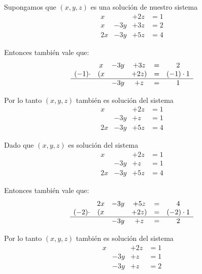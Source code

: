 \documentclass[handout]{beamer} %
\renewcommand{\_}[1]{_{\left( #1 \right)}}
\renewcommand{\^}[1]{^{\left( #1 \right)}}
\begin{document}
\begin{frame}
Supongamos que $(x,y,z)$ es una solución de nuestro sistema
\begin{equation*}
\begin{matrix}
x &  & +2z & = 1 \\
x& -3y & +3z & =2 \\
2x& -3y & +5z & =4
\end{matrix}
\end{equation*}

 
Entonces también vale que: 
\begin{equation*}
\begin{matrix}
&x& -3y & +3z & = & 2 \\
(-1)\cdot&(x &  & +2z) & = &(-1)\cdot1 \\
\hline
&& -3y & +z & = & 1  
\end{matrix}
\end{equation*}
\pause
 
Por lo tanto $(x,y,z)$ también es solución del sistema
\begin{equation*}
\begin{matrix}
x &  & +2z & = 1 \\
& -3y & +z & = 1   \\
2x& -3y & +5z & =4
\end{matrix}
\end{equation*}
 
\end{frame}


\begin{frame}

Dado que $(x,y,z)$ es solución del sistema
\begin{equation*}
\begin{matrix}
x &  & +2z & = 1 \\
& -3y & +z & = 1   \\
2x& -3y & +5z & =4
\end{matrix}
\end{equation*}

 
Entonces también vale que: 
\begin{equation*}
\begin{matrix}
&2x& -3y & +5z & = &4 \\
(-2)\cdot&(x &  & +2z) & = &(-2)\cdot1 \\
\hline
& & -3y & + z & = & 2  
\end{matrix}
\end{equation*}

 \pause
Por lo tanto $(x,y,z)$ también es solución del sistema
\begin{equation*}
\begin{matrix}
x &  & +2z & = 1 \\
& -3y & +z & = 1   \\
& -3y & +z & = 2
\end{matrix}
\end{equation*}
\end{frame}
\end{document}
